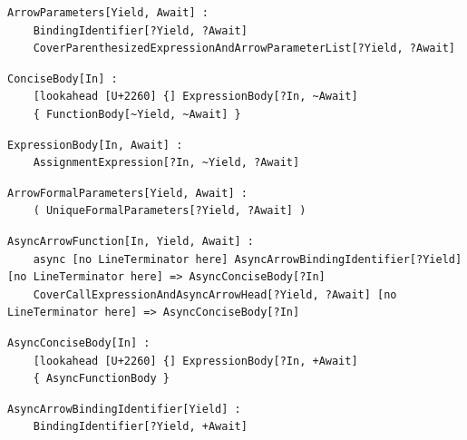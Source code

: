 \noindent\textbf{\texttt{}}\par
\begin{lstlisting}
ArrowParameters[Yield, Await] :
    BindingIdentifier[?Yield, ?Await]
    CoverParenthesizedExpressionAndArrowParameterList[?Yield, ?Await]
\end{lstlisting}

\noindent\textbf{\texttt{}}\par
\begin{lstlisting}
ConciseBody[In] :
    [lookahead [U+2260] {] ExpressionBody[?In, ~Await]
    { FunctionBody[~Yield, ~Await] }
\end{lstlisting}

\noindent\textbf{\texttt{}}\par
\begin{lstlisting}
ExpressionBody[In, Await] :
    AssignmentExpression[?In, ~Yield, ?Await]
\end{lstlisting}

\noindent\textbf{\texttt{}}\par
\begin{lstlisting}
ArrowFormalParameters[Yield, Await] :
    ( UniqueFormalParameters[?Yield, ?Await] )
\end{lstlisting}

\noindent\textbf{\texttt{}}\par
\begin{lstlisting}
AsyncArrowFunction[In, Yield, Await] :
    async [no LineTerminator here] AsyncArrowBindingIdentifier[?Yield] [no LineTerminator here] => AsyncConciseBody[?In]
    CoverCallExpressionAndAsyncArrowHead[?Yield, ?Await] [no LineTerminator here] => AsyncConciseBody[?In]
\end{lstlisting}

\noindent\textbf{\texttt{}}\par
\begin{lstlisting}
AsyncConciseBody[In] :
    [lookahead [U+2260] {] ExpressionBody[?In, +Await]
    { AsyncFunctionBody }
\end{lstlisting}

\noindent\textbf{\texttt{}}\par
\begin{lstlisting}
AsyncArrowBindingIdentifier[Yield] :
    BindingIdentifier[?Yield, +Await]
\end{lstlisting}

